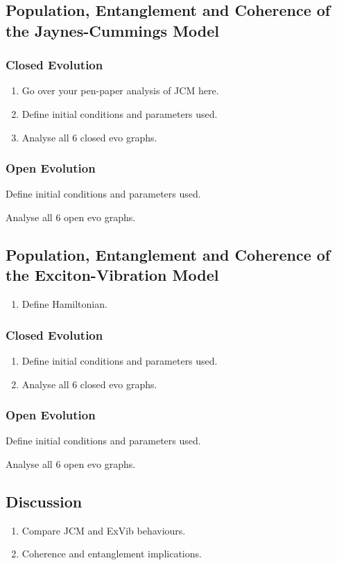 \documentclass{article}
\begin{document}
\subsection{Population, Entanglement and Coherence of the Jaynes-Cummings Model}
\subsubsection{Closed Evolution}
\begin{enumerate}
    \item Go over your pen-paper analysis of JCM here.
    \item Define initial conditions and parameters used. 
    \item Analyse all 6 closed evo graphs. 
\end{enumerate}
\subsubsection{Open Evolution}
    \item Define initial conditions and parameters used. 
    \item Analyse all 6 open evo graphs. 
\subsection{Population, Entanglement and Coherence of the Exciton-Vibration Model}
\begin{enumerate}
    \item Define Hamiltonian.
\end{enumerate}
\subsubsection{Closed Evolution}
\begin{enumerate}
    \item Define initial conditions and parameters used. 
    \item Analyse all 6 closed evo graphs. 
\end{enumerate}
\subsubsection{Open Evolution}
    \item Define initial conditions and parameters used. 
    \item Analyse all 6 open evo graphs. 
\subsection{Discussion}
\begin{enumerate}
  \item Compare JCM and ExVib behaviours.
  \item Coherence and entanglement implications.
\end{enumerate}
\newpage
\end{document}
